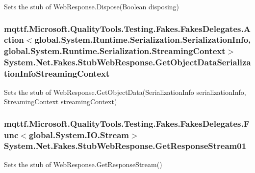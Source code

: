 Sets the stub of Web\-Response.\-Dispose(\-Boolean disposing)

\hypertarget{class_system_1_1_net_1_1_fakes_1_1_stub_web_response_a42910829eedb4208946d7f6360c5d729}{
\subsubsection[{Get\-Object\-Data\-Serialization\-Info\-Streaming\-Context}]{\setlength{\rightskip}{0pt plus 5cm}mqttf.\-Microsoft.\-Quality\-Tools.\-Testing.\-Fakes.\-Fakes\-Delegates.\-Action$<$global.\-System.\-Runtime.\-Serialization.\-Serialization\-Info, global.\-System.\-Runtime.\-Serialization.\-Streaming\-Context$>$ System.\-Net.\-Fakes.\-Stub\-Web\-Response.\-Get\-Object\-Data\-Serialization\-Info\-Streaming\-Context}}\label{class_system_1_1_net_1_1_fakes_1_1_stub_web_response_a42910829eedb4208946d7f6360c5d729}


Sets the stub of Web\-Response.\-Get\-Object\-Data(\-Serialization\-Info serialization\-Info, Streaming\-Context streaming\-Context)

\hypertarget{class_system_1_1_net_1_1_fakes_1_1_stub_web_response_a1d8adcbe7ab1f10c6405679dfffa3afd}{
\subsubsection[{Get\-Response\-Stream01}]{\setlength{\rightskip}{0pt plus 5cm}mqttf.\-Microsoft.\-Quality\-Tools.\-Testing.\-Fakes.\-Fakes\-Delegates.\-Func$<$global.\-System.\-I\-O.\-Stream$>$ System.\-Net.\-Fakes.\-Stub\-Web\-Response.\-Get\-Response\-Stream01}}\label{class_system_1_1_net_1_1_fakes_1_1_stub_web_response_a1d8adcbe7ab1f10c6405679dfffa3afd}


Sets the stub of Web\-Response.\-Get\-Response\-Stream()

